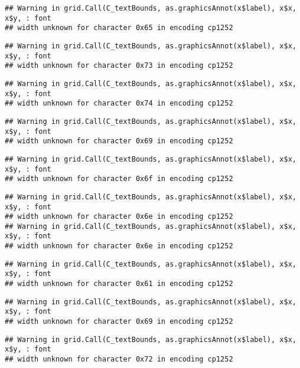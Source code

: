 \documentclass[
]{article}
\begin{document}
\begin{verbatim}
## Warning in grid.Call(C_textBounds, as.graphicsAnnot(x$label), x$x, x$y, : font
## width unknown for character 0x65 in encoding cp1252
\end{verbatim}

\begin{verbatim}
## Warning in grid.Call(C_textBounds, as.graphicsAnnot(x$label), x$x, x$y, : font
## width unknown for character 0x73 in encoding cp1252
\end{verbatim}

\begin{verbatim}
## Warning in grid.Call(C_textBounds, as.graphicsAnnot(x$label), x$x, x$y, : font
## width unknown for character 0x74 in encoding cp1252
\end{verbatim}

\begin{verbatim}
## Warning in grid.Call(C_textBounds, as.graphicsAnnot(x$label), x$x, x$y, : font
## width unknown for character 0x69 in encoding cp1252
\end{verbatim}

\begin{verbatim}
## Warning in grid.Call(C_textBounds, as.graphicsAnnot(x$label), x$x, x$y, : font
## width unknown for character 0x6f in encoding cp1252
\end{verbatim}

\begin{verbatim}
## Warning in grid.Call(C_textBounds, as.graphicsAnnot(x$label), x$x, x$y, : font
## width unknown for character 0x6e in encoding cp1252
## Warning in grid.Call(C_textBounds, as.graphicsAnnot(x$label), x$x, x$y, : font
## width unknown for character 0x6e in encoding cp1252
\end{verbatim}

\begin{verbatim}
## Warning in grid.Call(C_textBounds, as.graphicsAnnot(x$label), x$x, x$y, : font
## width unknown for character 0x61 in encoding cp1252
\end{verbatim}

\begin{verbatim}
## Warning in grid.Call(C_textBounds, as.graphicsAnnot(x$label), x$x, x$y, : font
## width unknown for character 0x69 in encoding cp1252
\end{verbatim}

\begin{verbatim}
## Warning in grid.Call(C_textBounds, as.graphicsAnnot(x$label), x$x, x$y, : font
## width unknown for character 0x72 in encoding cp1252
\end{verbatim}
\end{document}
